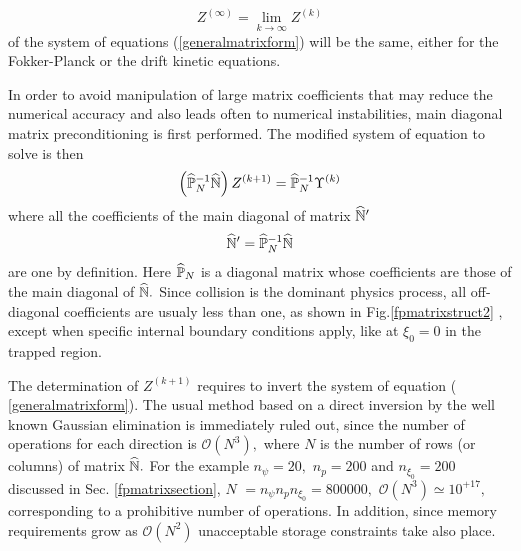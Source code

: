 \begin{equation}
Z^{(\infty )}=\lim_{k\rightarrow \infty }Z^{(k)}
\end{equation}
of the system of equations (\ref{generalmatrixform}) will be the same,
either for the Fokker-Planck or the drift kinetic equations.

In order to avoid manipulation of large matrix coefficients that may reduce
the numerical accuracy and also leads often to numerical instabilities, main
diagonal matrix preconditioning is first performed. The modified system of
equation to solve is then
\begin{equation}
\left( \widehat{\Bbb{P}}_{N}^{-1}\widehat{\Bbb{N}}\right) Z^{(k+1)}=\widehat{%
\Bbb{P}}_{N}^{-1}\Upsilon ^{(k)}
\end{equation}
where all the coefficients of the main diagonal of matrix $\widehat{\Bbb{N}}%
^{\prime }$%
\begin{equation}
\widehat{\Bbb{N}}^{\prime }=\widehat{\Bbb{P}}_{N}^{-1}\widehat{\Bbb{N}}
\end{equation}
are one by definition. Here $\widehat{\Bbb{P}}_{N}$ is a diagonal matrix
whose coefficients are those of the main diagonal of $\widehat{\Bbb{N}}.$
Since collision is the dominant physics process, all off-diagonal
coefficients are usualy less than one, as shown in Fig.\ref{fpmatrixstruct2}%
, except when specific internal boundary conditions apply, like at $\xi
_{0}=0$ in the trapped region.

%


The determination of $Z^{(k+1)}$ requires to invert the system of equation (%
\ref{generalmatrixform}). The usual method based on a direct inversion by
the well known Gaussian elimination is immediately ruled out, since the
number of operations for each direction is $\mathcal{O}\left( N^{3}\right) ,$
where $N$ is the number of rows (or columns) of matrix $\widehat{\Bbb{N}}.$
For the example $n_{\psi }=20,$ $n_{p}=200$ and $n_{\xi _{0}}=200$ discussed
in Sec. \ref{fpmatrixsection}, $N$ $=n_{\psi }n_{p}n_{\xi _{0}}=800000,$ $%
\mathcal{O}\left( N^{3}\right) \simeq 10^{+17},$ corresponding to a
prohibitive number of operations. In addition, since memory requirements
grow as $\mathcal{O}\left( N^{2}\right) $ unacceptable storage constraints
take also place.

